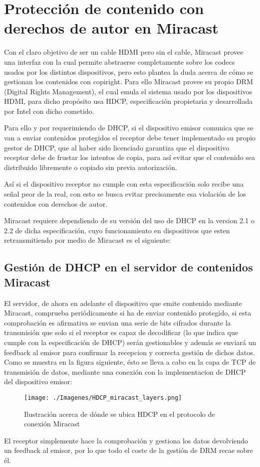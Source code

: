 \section{Protección de contenido con derechos de autor en Miracast}

Con el claro objetivo de ser un cable HDMI pero sin el cable, Miracast provee una interfaz con la cual permite abstraerse completamente sobre los codecs usados por los distintos dispositivos, pero esto plantea la duda acerca de cómo se gestionan los contenidos con copiright. Para ello Miracast provee su propio DRM (Digital Rights Management), el cual emula el sistema usado por los dispositivos HDMI, para dicho propósito usa HDCP, especificación propietaria y desarrollada por Intel con dicho cometido.

Para ello y por requerimiendo de DHCP, si el dispositivo emisor comunica que se van a enviar contenidos protegidos el receptor debe tener implementado su propio gestor de DHCP, que al haber sido licenciado garantiza que el dispositivo receptor debe de frustar los intentos de copia, para así evitar que el contenido sea distribuido libremente o copiado sin previa autorización.

Así si el dispositivo receptor no cumple con esta especificación solo recibe una señal peor de la real, con esto se busca evitar precisamente esa violación de los contenidos con derechos de autor.

Miracast requiere dependiendo de su versión del uso de DHCP en la version 2.1 o 2.2 de dicha especificación, cuyo funcionamiento en dispositivos que esten retransmitiendo por medio de Miracast es el siguiente:

\subsection{Gestión de DHCP en el servidor de contenidos Miracast}

El servidor, de ahora en adelante el dispositivo que emite contenido mediante Miracast, comprueba periódicamente si ha de enviar contenido protegido, si esta comprobación es afirmativa se envian una serie de bits cifrados durante la transmisión que solo si el receptor es capaz de decodificar (lo que indica que cumple con la especificación de DHCP) serán gestionables y además se enviará un feedback al emisor para confirmar la recepcion y correcta gestión de dichos datos. Como se muestra en la figura siguiente, ésto se lleva a cabo en la capa de TCP de transmisión de datos, mediante una conexión con la implementacion de DHCP del dispositivo emisor:

\begin{figure}[ht]
  \begin{centering}
    \texttt{[image: ./Imagenes/HDCP\_miracast\_layers.png]}
    \caption{Ilustración acerca de dónde se ubica HDCP en el protocolo de conexión Miracast}
  \end{centering}
\end{figure}

El receptor simplemente hace la comprobación y gestiona los datos devolviendo un feedback al emisor, por lo que todo el coste de la gestión de DRM recae sobre él.

